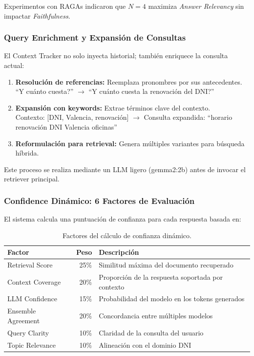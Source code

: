 Experimentos con RAGAs indicaron que $N=4$ maximiza \textit{Answer Relevancy} sin impactar \textit{Faithfulness}.

\subsubsection{Query Enrichment y Expansi\'on de Consultas}
\label{subsubsec:query-enrichment}

El Context Tracker no solo inyecta historial; tambi\'en enriquece la consulta actual:

\begin{enumerate}
    \item \textbf{Resoluci\'on de referencias:} Reemplaza pronombres por sus antecedentes.\\
    ``\textquestiondown Y cu\'anto cuesta?'' $\rightarrow$ ``\textquestiondown Y cu\'anto cuesta la renovaci\'on del DNI?''
    \item \textbf{Expansi\'on con keywords:} Extrae t\'erminos clave del contexto.\\
    Contexto: [DNI, Valencia, renovaci\'on] $\rightarrow$ Consulta expandida: ``horario renovaci\'on DNI Valencia oficinas''
    \item \textbf{Reformulaci\'on para retrieval:} Genera m\'ultiples variantes para b\'usqueda h\'ibrida.
\end{enumerate}

Este proceso se realiza mediante un LLM ligero (gemma2:2b) antes de invocar el retriever principal.

\subsubsection{Confidence Din\'amico: 6 Factores de Evaluaci\'on}
\label{subsubsec:confidence-dinamico}

El sistema calcula una puntuaci\'on de confianza para cada respuesta basada en:

\begin{table}[H]
\centering
\caption{Factores del c\'alculo de confianza din\'amico.}
\label{tab:confidence-factors}
\begin{tabular}{@{}lrl@{}}
\toprule
\textbf{Factor} & \textbf{Peso} & \textbf{Descripci\'on} \\
\midrule
Retrieval Score & 25\% & Similitud m\'axima del documento recuperado \\
Context Coverage & 20\% & Proporci\'on de la respuesta soportada por contexto \\
LLM Confidence & 15\% & Probabilidad del modelo en los tokens generados \\
Ensemble Agreement & 20\% & Concordancia entre m\'ultiples modelos \\
Query Clarity & 10\% & Claridad de la consulta del usuario \\
Topic Relevance & 10\% & Alineaci\'on con el dominio DNI \\
\bottomrule
\end{tabular}
\end{table}

